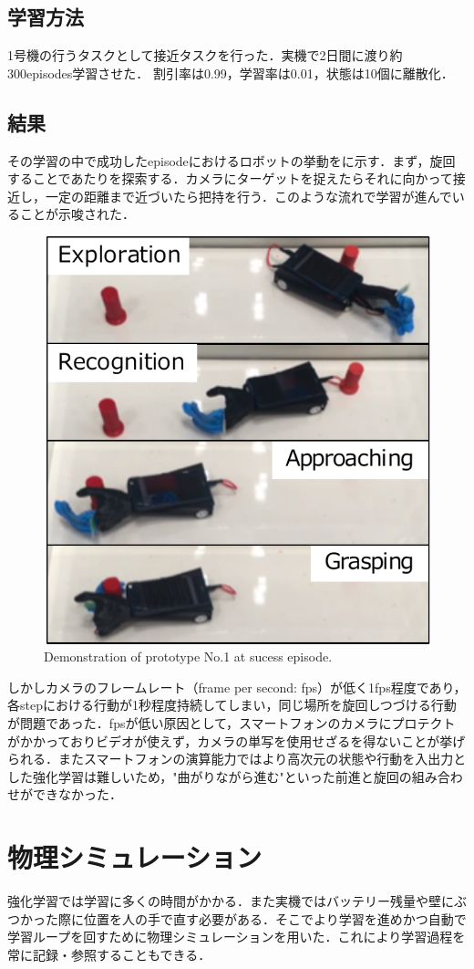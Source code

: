 \subsection{学習方法}
1号機の行うタスクとして接近タスクを行った．実機で2日間に渡り約300episodes学習させた．
割引率は0.99，学習率は0.01，状態は10個に離散化．


\subsection{結果}
その学習の中で成功したepisodeにおけるロボットの挙動をに示す．まず，旋回することであたりを探索する．カメラにターゲットを捉えたらそれに向かって接近し，一定の距離まで近づいたら把持を行う．このような流れで学習が進んでいることが示唆された．

\begin{figure}[H]
    \centering
    \includegraphics[width=0.7\linewidth]{figure/chapter3/robothand-v1_demo}
    \caption{Demonstration of prototype No.1 at sucess episode.}
    \label{fig:1号機例}
\end{figure}

しかしカメラのフレームレート（frame per second: fps）が低く1fps程度であり，各stepにおける行動が1秒程度持続してしまい，同じ場所を旋回しつづける行動が問題であった．fpsが低い原因として，スマートフォンのカメラにプロテクトがかかっておりビデオが使えず，カメラの単写を使用せざるを得ないことが挙げられる．またスマートフォンの演算能力ではより高次元の状態や行動を入出力とした強化学習は難しいため，"曲がりながら進む"といった前進と旋回の組み合わせができなかった．


\section{物理シミュレーション}
強化学習では学習に多くの時間がかかる．また実機ではバッテリー残量や壁にぶつかった際に位置を人の手で直す必要がある．そこでより学習を進めかつ自動で学習ループを回すために物理シミュレーションを用いた．これにより学習過程を常に記録・参照することもできる．


